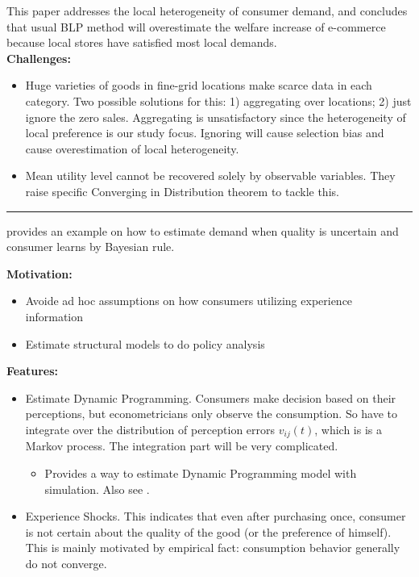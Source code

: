 \documentclass{book}
\theoremstyle{plain}
\theoremstyle{definition}
\newcommand{\myline}{\vspace{3mm} \hrule \vspace{4mm}}
\begin{document}
\textbf{}

This paper addresses the local heterogeneity of consumer demand,
and concludes that usual BLP method will overestimate the welfare increase of e-commerce because local stores have satisfied most local demands.\\

\noindent
\textbf{Challenges:}
\begin{itemize}
	\item Huge varieties of goods in fine-grid locations make scarce data in each category. Two possible solutions for this: 1) aggregating over locations; 2) just ignore the zero sales. 
	Aggregating is unsatisfactory since the heterogeneity of local preference is our study focus.
	Ignoring will cause selection bias and cause overestimation of local heterogeneity.
	\item Mean utility level cannot be recovered solely by observable variables.
	They raise specific Converging in Distribution theorem to tackle this.
\end{itemize}


\myline

\textbf{}

\cite{erdem_kean:96_MngSci} provides an example on how to estimate demand when quality is uncertain and consumer learns by Bayesian rule.

\vspace{2mm}
\noindent
\textbf{Motivation:}
\begin{itemize}
	\item Avoide ad hoc assumptions on how consumers utilizing experience information
	\item Estimate structural models to do policy analysis
\end{itemize}

\noindent
\textbf{Features:}
\begin{itemize}
	\item Estimate Dynamic Programming.
	Consumers make decision based on their perceptions,
	but econometricians only observe the consumption. 
	So have to integrate over the distribution of perception errors $v_{ij}(t)$, which is is a Markov process.
	The integration part will be very complicated.
	\begin{itemize}
		\item Provides a way to estimate Dynamic Programming model with simulation. Also see \cite{keane_wolpin:94REStat}.
	\end{itemize}
	\item Experience Shocks.
	This indicates that even after purchasing once, 
	consumer is not certain about the quality of the good (or the preference of himself).
	This is mainly motivated by empirical fact: 
	consumption behavior generally do not converge.
\end{itemize}
\end{document}
